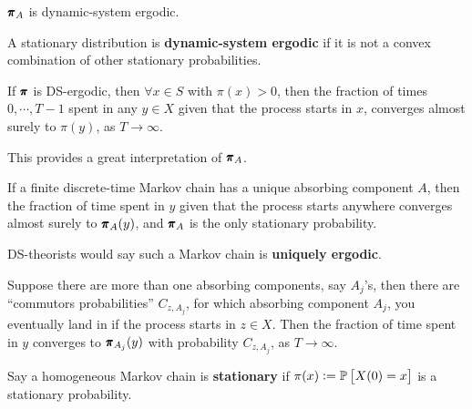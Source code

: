 \begin{remark}
    $\pmb{\pi}_A$ is dynamic-system ergodic.
\end{remark}

\begin{definition}
    A stationary distribution is \textbf{dynamic-system ergodic} if it is not a convex combination of other stationary probabilities.
\end{definition}

\begin{theorem}
    If $\pmb{\pi}$ is DS-ergodic, then $\forall x \in S$ with $\pi(x) > 0$, then the fraction of times $0, \cdots, T-1$ spent in any $y \in X$ given that the process starts in $x$, converges almost surely to $\pi(y)$, as $T \to \infty$.
\end{theorem}

\begin{remark}
    This provides a great interpretation of $\pmb{\pi}_A$.
\end{remark}

\begin{proposition}
    If a finite discrete-time Markov chain has a unique absorbing component $A$, then the fraction of time spent in $y$ given that the process starts anywhere converges almost surely to $\pmb{\pi}_A(y)$, and $\pmb{\pi}_A$ is the only stationary probability.
\end{proposition}

\begin{remark}
    DS-theorists would say such a Markov chain is \textbf{\textcolor{myblue}{uniquely ergodic}}.
\end{remark}

\begin{remark}
    Suppose there are more than one absorbing components, say $A_j$'s, then there are ``commutors probabilities'' $C_{z,A_j}$, for which absorbing component $A_j$, you eventually land in if the process starts in $z \in X$. Then the fraction of time spent in $y$ converges to $\pmb{\pi}_{A_j}(y)$ with probability $C_{z, A_j}$, as $T \to \infty$.
\end{remark}

\begin{definition}
    Say a homogeneous Markov chain is \textbf{stationary} if $\pi(x) := \mathbb{P} \left[ X(0) = x \right]$ is a stationary probability.
\end{definition}

